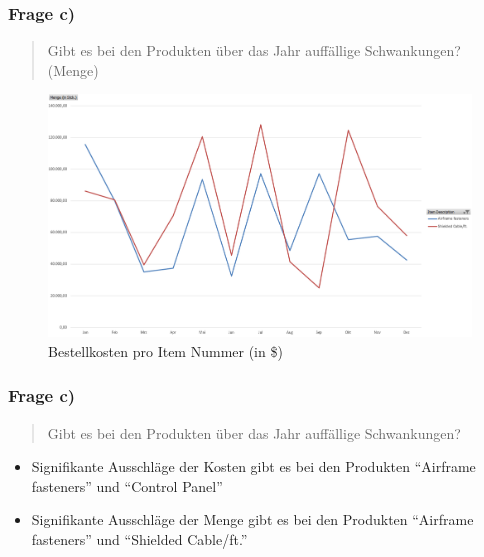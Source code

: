 \documentclass{beamer}
\begin{document}
\begin{frame}
\frametitle{Frage c)}

\begin{quote}
Gibt es bei den Produkten über das Jahr auff\"allige Schwankungen? (Menge)
\end{quote}

\begin{figure}
\includegraphics[scale=0.34]{pivot_itemNO_quantity2.PNG}
\caption{Bestellkosten pro Item Nummer (in \$)}
\end{figure}

\end{frame}

\begin{frame}
\frametitle{Frage c)}

\begin{quote}
Gibt es bei den Produkten über das Jahr auff\"allige Schwankungen?
\end{quote}

\begin{itemize}
\setlength{\itemsep}{30pt}
\item Signifikante Ausschl\"age der Kosten gibt es bei den Produkten ``Airframe fasteners'' und ``Control Panel''
\item Signifikante Ausschl\"age der Menge gibt es bei den Produkten ``Airframe fasteners'' und ``Shielded Cable/ft.''
\end{itemize}

\end{frame}
\end{document}
